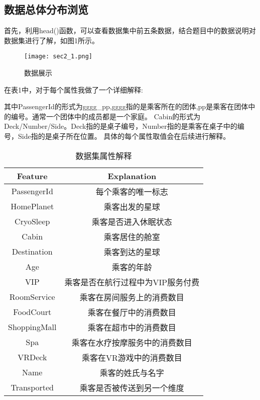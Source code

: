 \documentclass[../main.tex]{subfiles}
\begin{document}
    \subsection{数据总体分布浏览}

        首先，利用head()函数，可以查看数据集中前五条数据，结合题目中的数据说明对数据集进行了解，如图1所示。

        \begin{figure}[H]
            \centering
            \texttt{[image: sec2\_1.png]}
            \caption{数据展示}
            \label{tu2_1}
        \end{figure}

        在表1中，对于每个属性我做了一个详细解释:
        
        其中PassengerId的形式为gggg\_pp,gggg指的是乘客所在的团体,pp是乘客在团体中的编号。通常一个团体中的成员都是一个家庭。
        Cabin的形式为Deck/Number/Side。Deck指的是桌子编号，Number指的是乘客在桌子中的编号，Side指的是桌子所在位置。
        具体的每个属性取值会在后续进行解释。
            
        \begin{table}[H] 
            \centering
            \begin{tabular}{|c|c|} 
                \hline 
                \textbf{Feature} & \textbf{Explanation} \\ \hline 
                PassengerId & 每个乘客的唯一标志 \\ \hline 
                HomePlanet & 乘客出发的星球 \\ \hline 
                CryoSleep & 乘客是否进入休眠状态 \\ \hline 
                Cabin & 乘客居住的舱室 \\ \hline 
                Destination & 乘客到达的星球 \\ \hline 
                Age & 乘客的年龄 \\ \hline 
                VIP & 乘客是否在航行过程中为VIP服务付费 \\ \hline
                RoomService & 乘客在房间服务上的消费数目\\ \hline
                FoodCourt & 乘客在餐厅中的消费数目\\ \hline
                ShoppingMall & 乘客在超市中的消费数目\\ \hline
                Spa & 乘客在水疗按摩服务中的消费数目\\ \hline
                VRDeck & 乘客在VR游戏中的消费数目\\ \hline 
                Name & 乘客的姓氏与名字 \\ \hline 
                Transported & 乘客是否被传送到另一个维度 \\ \hline 
            \end{tabular} 
            \caption{数据集属性解释}
        \end{table}
\end{document}
